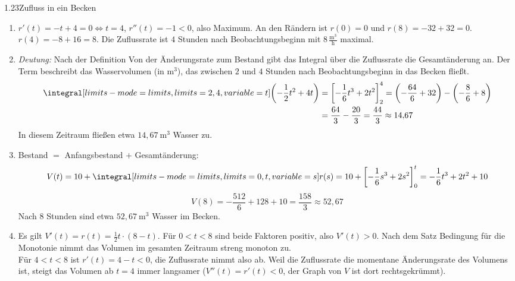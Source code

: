 \begin{loesung}{1.23}{Zufluss in ein Becken}
\begin{enumerate}[label=\alph*)]
  \item $r'(t) = -t+4 = 0 \Longleftrightarrow t=4$, $r''(t) = -1<0$, also Maximum. An den Rändern ist $r(0)=0$ und $r(8)=-32+32=0$.\\
  $r(4) = -8+16 = 8$. Die Zuflussrate ist $4$ Stunden nach Beobachtungsbeginn mit $8\,\frac{\text{m}^3}{\text{h}}$ maximal.
  \item \textit{Deutung:} Nach der Definition \glqq Von der Änderungsrate zum Bestand\grqq{} gibt das Integral über die Zuflussrate die Gesamtänderung an. Der Term beschreibt das Wasservolumen (in $\text{m}^3$), das zwischen $2$ und $4$ Stunden nach Beobachtungsbeginn in das Becken fließt.
  \begin{align*}
    \integral[limits-mode=limits,limits={2, 4}, variable={t}]{\left(-\dfrac{1}{2}t^2+4t\right)} &= \left[-\dfrac{1}{6}t^3+2t^2\right]_2^4 = \left(-\dfrac{64}{6}+32\right)-\left(-\dfrac{8}{6}+8\right)\\
    &= \dfrac{64}{3}-\dfrac{20}{3} = \dfrac{44}{3}\approx 14{,}67
  \end{align*}
  In diesem Zeitraum fließen etwa $14{,}67\ \text{m}^3$ Wasser zu.
  \item Bestand $=$ Anfangsbestand $+$ Gesamtänderung:
  \[V(t) = 10+\integral[limits-mode=limits,limits={0, t}, variable={s}]{r(s)} = 10+\left[-\dfrac{1}{6}s^3+2s^2\right]_0^t = -\dfrac{1}{6}t^3+2t^2+10\]
  \[V(8) = -\dfrac{512}{6}+128+10 = \dfrac{158}{3}\approx 52{,}67\]
  Nach $8$ Stunden sind etwa $52{,}67\ \text{m}^3$ Wasser im Becken.
  \item Es gilt $V'(t) = r(t) = \frac{1}{2}t\cdot(8-t)$. Für $0<t<8$ sind beide Faktoren positiv, also $V'(t)>0$. Nach dem Satz \glqq Bedingung für die Monotonie\grqq{} nimmt das Volumen im gesamten Zeitraum streng monoton zu.\\
  Für $4<t<8$ ist $r'(t) = 4-t<0$, die Zuflussrate nimmt also ab. Weil die Zuflussrate die momentane Änderungsrate des Volumens ist, steigt das Volumen ab $t=4$ immer langsamer ($V''(t) = r'(t)<0$, der Graph von $V$ ist dort rechtsgekrümmt).
\end{enumerate}
\end{loesung}



